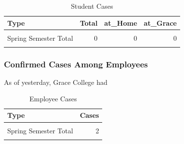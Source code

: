 \documentclass[
]{article}
\newenvironment{Shaded}{\begin{snugshade}}{\end{snugshade}}
\newcommand{\DataTypeTok}[1]{\textcolor[rgb]{0.13,0.29,0.53}{#1}}
\newcommand{\KeywordTok}[1]{\textcolor[rgb]{0.13,0.29,0.53}{\textbf{#1}}}
\newcommand{\NormalTok}[1]{#1}
\newcommand{\OperatorTok}[1]{\textcolor[rgb]{0.81,0.36,0.00}{\textbf{#1}}}
\newcommand{\OtherTok}[1]{\textcolor[rgb]{0.56,0.35,0.01}{#1}}
\newcommand{\StringTok}[1]{\textcolor[rgb]{0.31,0.60,0.02}{#1}}
\begin{document}
\begin{Shaded}
\end{Shaded}

\begin{table}[!h]

\caption{\label{tab:unnamed-chunk-2}Student Cases}
\centering
\begin{tabular}[t]{lrrr}
\toprule
Type & Total & at\_Home & at\_Grace\\
\midrule
\cellcolor{gray!6}{Active on Tue Jan 12} & \cellcolor{gray!6}{0} & \cellcolor{gray!6}{0} & \cellcolor{gray!6}{0}\\
Spring Semester Total & 0 & 0 & 0\\
\cellcolor{gray!6}{20-21 Academic Year Total} & \cellcolor{gray!6}{111} & \cellcolor{gray!6}{72} & \cellcolor{gray!6}{39}\\
\bottomrule
\end{tabular}
\end{table}

\hypertarget{confirmed-cases-among-employees}{%
\subsubsection{Confirmed Cases Among
Employees}\label{confirmed-cases-among-employees}}

As of yesterday, Grace College had

\begin{table}[!h]

\caption{\label{tab:unnamed-chunk-4}Employee Cases}
\centering
\begin{tabular}[t]{lr}
\toprule
Type & Cases\\
\midrule
\cellcolor{gray!6}{Active on Tue Jan 12} & \cellcolor{gray!6}{2}\\
Spring Semester Total & 2\\
\cellcolor{gray!6}{20-21 Academic Year Total} & \cellcolor{gray!6}{37}\\
\bottomrule
\end{tabular}
\end{table}
\end{document}
